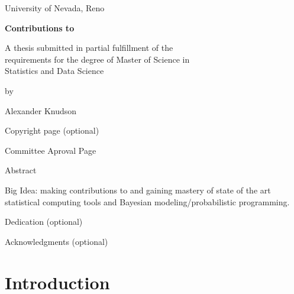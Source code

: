 \documentclass[11pt, oneside]{book}
\begin{document}
\begin{titlepage}
\begin{center}

University of Nevada, Reno

\textbf{Contributions to}

A thesis submitted in partial fulfillment of the \\
requirements for the degree of Master of Science in \\
Statistics and Data Science

by

Alexander Knudson




\end{center}
\end{titlepage}
\thispagestyle{empty}
Copyright page (optional)


\newpage
\thispagestyle{empty}
Committee Aproval Page


\newpage
\setcounter{page}{1} %
Abstract

Big Idea: making contributions to and gaining mastery of state of the art statistical computing tools and Bayesian modeling/probabilistic programming.


\newpage
Dedication (optional)


\newpage
Acknowledgments (optional)

\setcounter{tocdepth}{1}
\tableofcontents

\listoftables

\listoffigures
\mainmatter
\hypertarget{introduction}{%
\chapter{Introduction}\label{introduction}}
\end{document}
